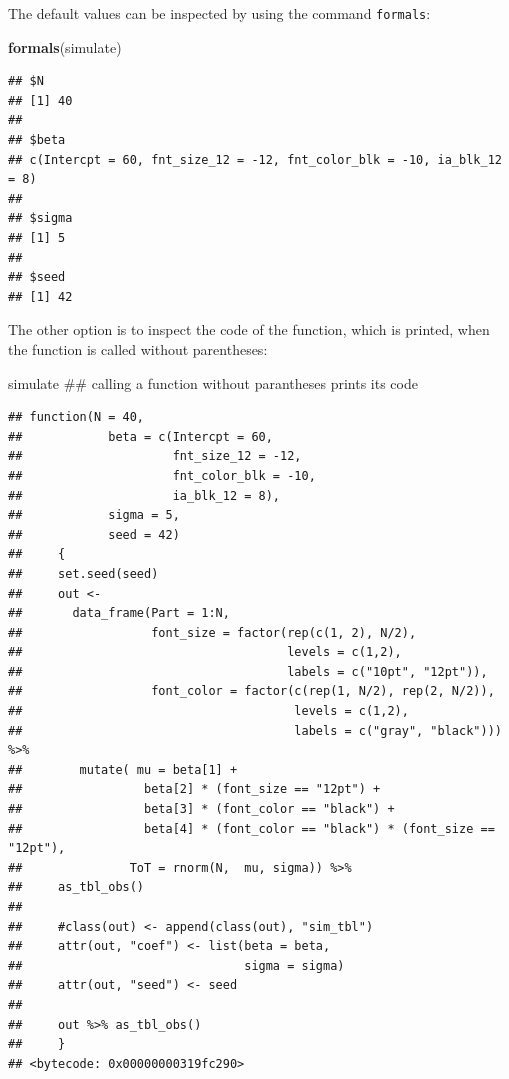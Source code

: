 \documentclass[]{svmono}
\newenvironment{Shaded}{\begin{snugshade}}{\end{snugshade}}
\newcommand{\KeywordTok}[1]{\textcolor[rgb]{0.13,0.29,0.53}{\textbf{#1}}}
\newcommand{\NormalTok}[1]{#1}
\begin{document}
The default values can be inspected by using the command
\texttt{formals}:

\begin{Shaded}
\begin{Highlighting}[]
\KeywordTok{formals}\NormalTok{(simulate)}
\end{Highlighting}
\end{Shaded}

\begin{verbatim}
## $N
## [1] 40
## 
## $beta
## c(Intercpt = 60, fnt_size_12 = -12, fnt_color_blk = -10, ia_blk_12 = 8)
## 
## $sigma
## [1] 5
## 
## $seed
## [1] 42
\end{verbatim}

The other option is to inspect the code of the function, which is
printed, when the function is called without parentheses:

\begin{Shaded}
\begin{Highlighting}[]
\NormalTok{simulate ## calling a function without parantheses prints its code}
\end{Highlighting}
\end{Shaded}

\begin{verbatim}
## function(N = 40,
##            beta = c(Intercpt = 60, 
##                     fnt_size_12 = -12, 
##                     fnt_color_blk = -10, 
##                     ia_blk_12 = 8),
##            sigma = 5,
##            seed = 42) 
##     {
##     set.seed(seed)
##     out <-
##       data_frame(Part = 1:N,
##                  font_size = factor(rep(c(1, 2), N/2), 
##                                     levels = c(1,2), 
##                                     labels = c("10pt", "12pt")),
##                  font_color = factor(c(rep(1, N/2), rep(2, N/2)),
##                                      levels = c(1,2), 
##                                      labels = c("gray", "black"))) %>%
##        mutate( mu = beta[1] + 
##                 beta[2] * (font_size == "12pt") +
##                 beta[3] * (font_color == "black") +
##                 beta[4] * (font_color == "black") * (font_size == "12pt"),
##               ToT = rnorm(N,  mu, sigma)) %>% 
##     as_tbl_obs()
##     
##     #class(out) <- append(class(out), "sim_tbl")
##     attr(out, "coef") <- list(beta = beta,
##                               sigma = sigma)
##     attr(out, "seed") <- seed
##     
##     out %>% as_tbl_obs()
##     }
## <bytecode: 0x00000000319fc290>
\end{verbatim}
\end{document}
